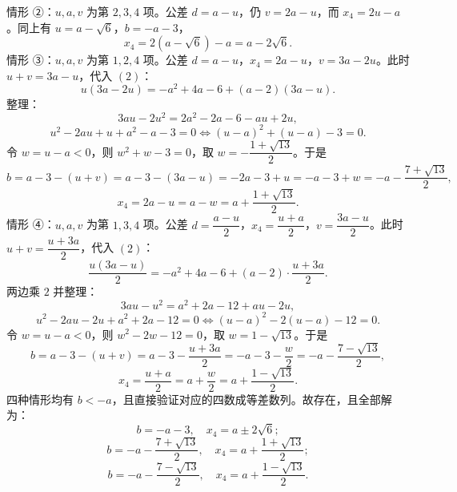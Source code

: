 \begin{answer}
情形 ②：$u,a,v$ 为第 $2,3,4$ 项。公差 $d=a-u$，仍 $v=2a-u$，而 $x_4=2u-a$。同上有 $u=a-\sqrt6$，$b=-a-3$，
\nopagebreak[4]
\[x_4=2(a-\sqrt6)-a=a-2\sqrt6.\]
情形 ③：$u,a,v$ 为第 $1,2,4$ 项。公差 $d=a-u$，$x_4=2a-u$，$v=3a-2u$。此时 $u+v=3a-u$，代入 $(2)$：
\nopagebreak[4]
\[u(3a-2u)=-a^2+4a-6+(a-2)(3a-u).\]
整理：
\nopagebreak[4]
\[3au-2u^2=2a^2-2a-6-au+2u,\]
\nopagebreak[4]
\[u^2-2au+u+a^2-a-3=0\iff(u-a)^2+(u-a)-3=0.\]
令 $w=u-a<0$，则 $w^2+w-3=0$，取 $w=-\dfrac{1+\sqrt{13}}2$。于是
\nopagebreak[4]
\[b=a-3-(u+v)=a-3-(3a-u)=-2a-3+u=-a-3+w=-a-\frac{7+\sqrt{13}}2,\]
\nopagebreak[4]
\[x_4=2a-u=a-w=a+\frac{1+\sqrt{13}}2.\]
情形 ④：$u,a,v$ 为第 $1,3,4$ 项。公差 $d=\dfrac{a-u}2$，$x_4=\dfrac{u+a}2$，$v=\dfrac{3a-u}2$。此时 $u+v=\dfrac{u+3a}2$，代入 $(2)$：
\nopagebreak[4]
\[\frac{u(3a-u)}2=-a^2+4a-6+(a-2)\cdot\frac{u+3a}2.\]
两边乘 $2$ 并整理：
\nopagebreak[4]
\[3au-u^2=a^2+2a-12+au-2u,\]
\nopagebreak[4]
\[u^2-2au-2u+a^2+2a-12=0\iff(u-a)^2-2(u-a)-12=0.\]
令 $w=u-a<0$，则 $w^2-2w-12=0$，取 $w=1-\sqrt{13}$。于是
\nopagebreak[4]
\[b=a-3-(u+v)=a-3-\frac{u+3a}2=-a-3-\frac w2=-a-\frac{7-\sqrt{13}}2,\]
\nopagebreak[4]
\[x_4=\frac{u+a}2=a+\frac w2=a+\frac{1-\sqrt{13}}2.\]
四种情形均有 $b<-a$，且直接验证对应的四数成等差数列。故存在，且全部解为：
\nopagebreak[4]
\[b=-a-3,\quad x_4=a\pm2\sqrt6;\]
\nopagebreak[4]
\[b=-a-\frac{7+\sqrt{13}}2,\quad x_4=a+\frac{1+\sqrt{13}}2;\]
\nopagebreak[4]
\[b=-a-\frac{7-\sqrt{13}}2,\quad x_4=a+\frac{1-\sqrt{13}}2.\]


\end{answer}